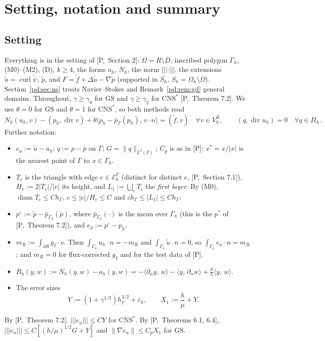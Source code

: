 \documentclass[11pt,reqno]{amsart}
\theoremstyle{plain}
\theoremstyle{definition}
\newcommand{\hG}{h_\Gamma}
\newcommand{\Gh}{\Gamma_h}
\newcommand{\Oh}{\Omega_h}
\newcommand{\EG}{\mathcal E_h^\Gamma}
\newcommand{\VR}{V_h^R}
\newcommand{\Pih}{\Pi_h}
\newcommand{\gI}{g_I}
\newcommand{\dn}{\partial_n}
\newcommand{\ut}{\tilde u}
\newcommand{\pt}{\tilde p}
\newcommand{\ft}{\tilde f}
\newcommand{\pbar}{\bar p}
\newcommand{\pbG}{\bar p_{\Gamma}}
\newcommand{\ip}[2]{\langle #1,\, #2\rangle}
\newcommand{\tnorm}[1]{|\!|\!|#1|\!|\!|}
\newcommand{\norm}[1]{\lVert #1\rVert}
\newcommand{\GS}{\mathrm{GS}}
\newcommand{\CNS}{\mathrm{CNS}^\ast}
\newcommand{\eps}{\varepsilon_h}
\newcommand{\curl}{\operatorname{curl}}
\renewcommand{\div}{\operatorname{div}}
\DeclareMathOperator{\diam}{diam}
\newcommand{\Pref}[1]{\textup{[P,~#1]}}
\newcommand{\Lay}{L_1}
\newcommand{\Bh}{B_h}
\begin{document}
\maketitle
\tableofcontents

\section{Setting, notation and summary}\label{pd:sec:setting}

\subsection{Setting}
Everything is in the setting of \Pref{Section 2}: $\Omega=R\setminus\overline D$, inscribed polygon $\Gh$, (M0)--(M2), (D), $k\ge4$, the forms $a_h$, $N_h$, the norm $\tnorm\cdot$, the extensions $\ut=\curl\tilde\psi$, $\pt$, and $F=\ft+\Delta\ut-\nabla\pt$ (supported in $\overline{S_h}$, $S_h=\Oh\setminus\overline\Omega$). Section~\ref{pd:sec:ns} treats Navier--Stokes and Remark~\ref{pd:rem:gd} general domains. Throughout, $\gamma\ge\gamma_0$ for $\GS$ and $\gamma\ge\gamma_2$ for $\CNS$ \Pref{Theorem 7.2}. We use $\theta=0$ for $\GS$ and $\theta=1$ for $\CNS$, so both methods read
\[
N_h(u_h,v)-(p_h,\div v)+\theta\ip{p_h-\pbG(p_h)}{v\cdot n}=(\ft,v)\quad\forall v\in\VR,\qquad (q,\div u_h)=0\quad\forall q\in\Pih .
\]
Further notation:
\begin{itemize}
\item $e_u:=\ut-u_h$; $q:=p-\pbar$ on $\Gamma$; $G=\norm q_{L^2(\Gamma)}$; $C_p$ is as in [P]; $x^\ast=x/|x|$ is the nearest point of $\Gamma$ to $x\in\Gh$.
\item $T_e$ is the triangle with edge $e\in\EG$ (distinct for distinct $e$, \Pref{Section 7.1}), $H_e:=2|T_e|/|e|$ its height, and $\Lay:=\bigcup_eT_e$ the \emph{first layer}. By (M0), $\diam T_e\le C\hG$, $c\le |e|/H_e\le C$ and $c\hG\le|\Lay|\le C\hG$.
\item $p^\circ:=\pt-\pbar_{\Gh}(\pt)$, where $\pbar_{\Gh}(\cdot)$ is the mean over $\Gh$ (this is the $p^\ast$ of \Pref{Theorem 7.2}), and $e_p:=p^\circ-p_h$.
\item $m_R:=\int_{\partial R}\gI\cdot\nu$. Then $\int_{\Gh}u_h\cdot n=-m_R$ and $\int_{\Gh}\ut\cdot n=0$, so $\int_{\Gh}e_u\cdot n=m_R$; and $m_R=0$ for flux-corrected $\gI$ and for the test data of [P].
\item $\Bh(y,w):=N_h(y,w)-a_h(y,w)=-\ip{\dn y}{w}-\ip{y}{\dn w}+\frac\mu h\ip yw$.
\item The error sizes
\[
Y:=(1+\gamma^{1/2})\hG^{3/2}+\eps,\qquad X_1:=\frac h\mu+Y .
\]
\end{itemize}
By \Pref{Theorem 7.2}, $\tnorm{e_u}\le CY$ for $\CNS$. By \Pref{Theorems 6.1, 6.4}, $\tnorm{e_u}\le C[(h/\mu)^{1/2}G+Y]$ and $\norm{\nabla e_u}\le C_pX_1$ for $\GS$.
\end{document}
